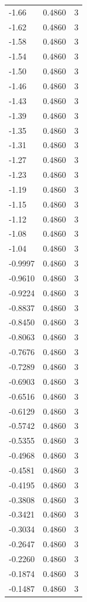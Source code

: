 \begin{longtable}{lrr}
  -1.66 & 0.4860 & 3 \\
  -1.62 & 0.4860 & 3 \\
  -1.58 & 0.4860 & 3 \\
  -1.54 & 0.4860 & 3 \\
  -1.50 & 0.4860 & 3 \\
  -1.46 & 0.4860 & 3 \\
  -1.43 & 0.4860 & 3 \\
  -1.39 & 0.4860 & 3 \\
  -1.35 & 0.4860 & 3 \\
  -1.31 & 0.4860 & 3 \\
  -1.27 & 0.4860 & 3 \\
  -1.23 & 0.4860 & 3 \\
  -1.19 & 0.4860 & 3 \\
  -1.15 & 0.4860 & 3 \\
  -1.12 & 0.4860 & 3 \\
  -1.08 & 0.4860 & 3 \\
  -1.04 & 0.4860 & 3 \\
  -0.9997 & 0.4860 & 3 \\
  -0.9610 & 0.4860 & 3 \\
  -0.9224 & 0.4860 & 3 \\
  -0.8837 & 0.4860 & 3 \\
  -0.8450 & 0.4860 & 3 \\
  -0.8063 & 0.4860 & 3 \\
  -0.7676 & 0.4860 & 3 \\
  -0.7289 & 0.4860 & 3 \\
  -0.6903 & 0.4860 & 3 \\
  -0.6516 & 0.4860 & 3 \\
  -0.6129 & 0.4860 & 3 \\
  -0.5742 & 0.4860 & 3 \\
  -0.5355 & 0.4860 & 3 \\
  -0.4968 & 0.4860 & 3 \\
  -0.4581 & 0.4860 & 3 \\
  -0.4195 & 0.4860 & 3 \\
  -0.3808 & 0.4860 & 3 \\
  -0.3421 & 0.4860 & 3 \\
  -0.3034 & 0.4860 & 3 \\
  -0.2647 & 0.4860 & 3 \\
  -0.2260 & 0.4860 & 3 \\
  -0.1874 & 0.4860 & 3 \\
  -0.1487 & 0.4860 & 3 \\

\end{longtable}
